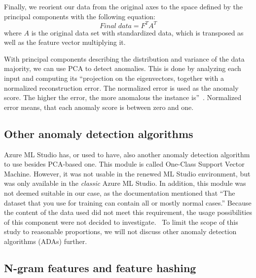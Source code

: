 Finally,
we reorient our data from the original axes
to the space defined by the principal components
with the following equation:
\begin{equation}
    Final\; data = F^{T} A^{T}
\end{equation}
where $A$ is the original data set with standardized data,
which is transposed as well as the feature vector multiplying it.\cite{jaadi2021pca,holland2008principal,smith2002tutorial}

With principal components describing the distribution and variance of the data majority,
we can use PCA to detect anomalies.
This is done by analyzing each input
and computing its
\enquote{projection on the eigenvectors,
    together with a normalized reconstruction error.
    The normalized error is used as the anomaly score.
    The higher the error, the more anomalous the instance is}~\cite{azure2022pca}.
Normalized error means,
that each anomaly score is between zero and one.




\subsection{Other anomaly detection algorithms}\label{bg-other-ada}

Azure ML Studio has,
or used to have,
also another anomaly detection algorithm to use besides PCA-based one.
This module is called One-Class Support Vector Machine.
However,
it was not usable in the renewed ML Studio environment,
but was only available in the \textit{classic} Azure ML Studio.
In addition,
this module was not deemed suitable in our case,
as the documentation mentioned that
\enquote{The dataset that you use for training
can contain all or mostly normal cases.}
Because the content of the data used did not meet this requirement,
the usage possibilities of this component were not decided to investigate.~\cite{azure2021oneclasssvm}
To limit the scope of this study to reasonable proportions,
we will not discuss other anomaly detection algorithms (ADAs) further.


\subsection{N-gram features and feature hashing}\label{subsec:bg-ngram-features-and-hashing}

